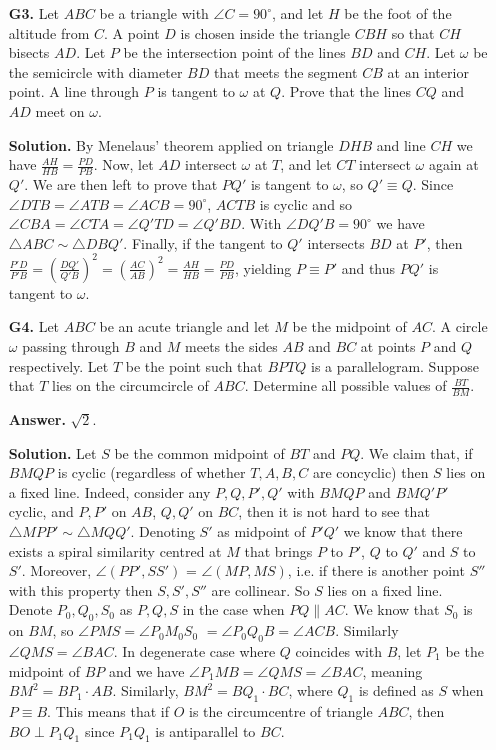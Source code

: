 \documentclass[11pt,a4paper]{article}
\begin{document}
\begin{enumerate}
\item[\textbf{G3.}] Let $ABC$ be a triangle with $\angle{C} = 90^{\circ}$, and let $H$ be the foot of the altitude from $C$. A point $D$ is chosen inside the triangle $CBH$ so that $CH$ bisects $AD$. Let $P$ be the intersection point of the lines $BD$ and $CH$. Let $\omega$ be the semicircle with diameter $BD$ that meets the segment $CB$ at an interior point. A line through $P$ is tangent to $\omega$ at $Q$. Prove that the lines $CQ$ and $AD$ meet on $\omega$.

\textbf{Solution.} By Menelaus' theorem applied on triangle $DHB$ and line $CH$ we have $\frac{AH}{HB}=\frac{PD}{PB}$. Now, let $AD$ intersect $\omega$ at $T$, and let $CT$ intersect $\omega$ again at $Q'$. We are then left to prove that $PQ'$ is tangent to $\omega$, so $Q'\equiv Q$. Since $\angle DTB=\angle ATB=\angle ACB=90^{\circ}$, $ACTB$ is cyclic and so $\angle CBA=\angle CTA=\angle Q'TD=\angle Q'BD$. With $\angle DQ'B=90^{\circ}$ we have $\triangle ABC\sim\triangle DBQ'$. Finally, if the tangent to $Q'$ intersects $BD$ at $P'$, then $\frac{P'D}{P'B}=(\frac{DQ'}{Q'B})^2=(\frac{AC}{AB})^2=\frac{AH}{HB}=\frac{PD}{PB}$, yielding $P\equiv P'$ and thus $PQ'$ is tangent to $\omega$.

\item[\textbf{G4.}] Let $ABC$ be an acute triangle and let $M$ be the midpoint of $AC$. A circle $\omega$ passing through $B$ and $M$ meets the sides $AB$ and $BC$ at points $P$ and $Q$ respectively. Let $T$ be the point such that $BPTQ$ is a parallelogram. Suppose that $T$ lies on the circumcircle of $ABC$. Determine all possible values of $\frac{BT}{BM}$.

\textbf{Answer.} $\sqrt{2}$. 

\textbf{Solution.} Let $S$ be the common midpoint of $BT$ and $PQ$. We claim that, if $BMQP$ is cyclic (regardless of whether $T, A, B, C$ are concyclic) then $S$ lies on a fixed line. Indeed, consider any $P, Q, P', Q'$ with $BMQP$ and $BMQ'P'$ cyclic, and $P, P'$ on $AB$, $Q, Q'$ on $BC$, then it is not hard to see that $\triangle MPP'\sim\triangle MQQ'$. Denoting $S'$ as midpoint of $P'Q'$ we know that there exists a spiral similarity centred at $M$ that brings $P$ to $P'$, $Q$ to $Q'$ and $S$ to $S'$. Moreover, $\angle (PP', SS')$ = $\angle (MP, MS)$, i.e. if there is another point $S''$ with this property then $S, S', S''$ are collinear. So $S$ lies on a fixed line. Denote $P_0, Q_0, S_0$ as $P, Q, S$ in the case when $PQ\parallel AC$. We know that $S_0$ is on $BM$, so $\angle PMS=\angle P_0M_0S_0$ $= \angle P_0Q_0B = \angle ACB.$ Similarly $\angle QMS=\angle BAC$. In degenerate case where $Q$ coincides with $B$, let $P_1$ be the midpoint of $BP$ and we have $\angle P_1MB=\angle QMS=\angle BAC$, meaning $BM^2=BP_1\cdot AB$. Similarly, $BM^2=BQ_1\cdot BC$, where $Q_1$ is defined as $S$ when $P\equiv B$. This means that if $O$ is the circumcentre of triangle $ABC$, then $BO\perp P_1Q_1$ since $P_1Q_1$ is antiparallel to $BC$.


\end{enumerate}
\end{document}
